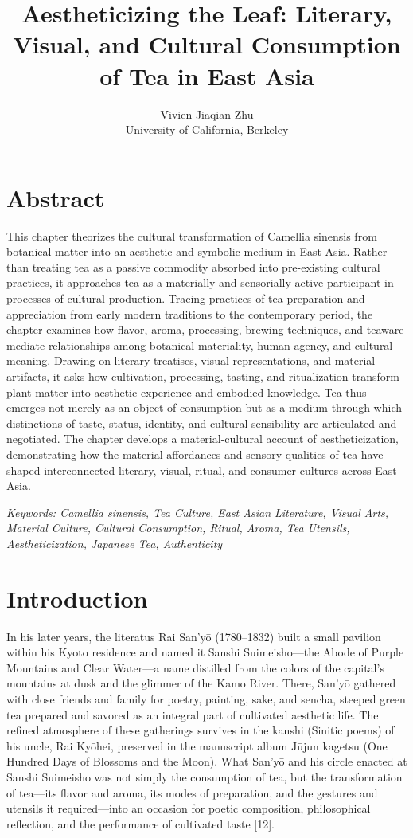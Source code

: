 \documentclass[11pt,a4paper]{article}
\title{\textbf{Aestheticizing the Leaf: Literary, Visual, and Cultural Consumption of Tea in East Asia}}
\author{Vivien Jiaqian Zhu\\[2pt]\small University of California, Berkeley}
\date{}
\begin{document}
\maketitle

\section*{Abstract}

This chapter theorizes the cultural transformation of Camellia sinensis from botanical matter into an aesthetic and symbolic medium in East Asia. Rather than treating tea as a passive commodity absorbed into pre-existing cultural practices, it approaches tea as a materially and sensorially active participant in processes of cultural production. Tracing practices of tea preparation and appreciation from early modern traditions to the contemporary period, the chapter examines how flavor, aroma, processing, brewing techniques, and teaware mediate relationships among botanical materiality, human agency, and cultural meaning. Drawing on literary treatises, visual representations, and material artifacts, it asks how cultivation, processing, tasting, and ritualization transform plant matter into aesthetic experience and embodied knowledge. Tea thus emerges not merely as an object of consumption but as a medium through which distinctions of taste, status, identity, and cultural sensibility are articulated and negotiated. The chapter develops a material-cultural account of aestheticization, demonstrating how the material affordances and sensory qualities of tea have shaped interconnected literary, visual, ritual, and consumer cultures across East Asia.

\emph{Keywords: Camellia sinensis, Tea Culture, East Asian Literature, Visual Arts, Material Culture, Cultural Consumption, Ritual, Aroma, Tea Utensils, Aestheticization, Japanese Tea, Authenticity}

\section{Introduction}

In his later years, the literatus Rai San'yō (1780--1832) built a small pavilion within his Kyoto residence and named it Sanshi Suimeisho---the Abode of Purple Mountains and Clear Water---a name distilled from the colors of the capital's mountains at dusk and the glimmer of the Kamo River. There, San'yō gathered with close friends and family for poetry, painting, sake, and sencha, steeped green tea prepared and savored as an integral part of cultivated aesthetic life. The refined atmosphere of these gatherings survives in the kanshi (Sinitic poems) of his uncle, Rai Kyōhei, preserved in the manuscript album Jūjun kagetsu (One Hundred Days of Blossoms and the Moon). What San'yō and his circle enacted at Sanshi Suimeisho was not simply the consumption of tea, but the transformation of tea---its flavor and aroma, its modes of preparation, and the gestures and utensils it required---into an occasion for poetic composition, philosophical reflection, and the performance of cultivated taste [12].
\end{document}
